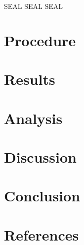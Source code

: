\documentclass[prb,preprint]{revtex4-1}
\begin{document}
{SEAL SEAL SEAL}


\section{Procedure}



\section{Results}


\section{Analysis}


\section{Discussion}




\section{Conclusion}


\section{References}
\end{document}
